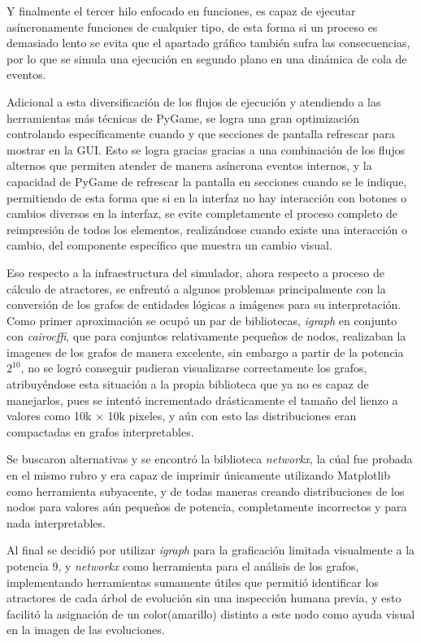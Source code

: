 \documentclass[]{article}
\begin{document}
		\hfill\break
		\justifying
		Y finalmente el tercer hilo enfocado en funciones, es capaz de ejecutar asíncronamente funciones de cualquier tipo, de esta forma si un proceso es demasiado lento se evita que el apartado gráfico también sufra las consecuencias, por lo que se simula una ejecución en segundo plano en una dinámica de cola de eventos.
		
		\hfill\break
		\justifying
		Adicional a esta diversificación de los flujos de ejecución y atendiendo a las herramientas más técnicas de PyGame, se logra una gran optimización controlando específicamente cuando y que secciones de pantalla refrescar para mostrar en la GUI. Esto se logra gracias gracias a una combinación de los flujos alternos que permiten atender de manera asíncrona eventos internos, y la capacidad de PyGame de refrescar la pantalla en secciones cuando se le indique, permitiendo de esta forma que si en la interfaz no hay interacción con botones o cambios diversos en la interfaz, se evite completamente el proceso completo de reimpresión de todos los elementos, realizándose cuando existe una interacción o cambio, del componente específico que muestra un cambio visual.
		
		\hfill\break
		\justifying
		Eso respecto a la infraestructura del simulador, ahora respecto a proceso de cálculo de atractores, se enfrentó a algunos problemas principalmente con la conversión de los grafos de entidades lógicas a imágenes para su interpretación. Como primer aproximación se ocupó un par de bibliotecas, \textit{igraph} en conjunto con \textit{cairocffi}, que para conjuntos relativamente pequeños de nodos, realizaban la imagenes de los grafos de manera excelente, sin embargo a partir de la potencia $2^10$, no se logró conseguir pudieran visualizarse correctamente los grafos, atribuyéndose esta situación a la propia biblioteca que ya no es capaz de manejarlos, pues se intentó incrementado drásticamente el tamaño del lienzo a valores como 10k $\times$ 10k pixeles, y aún con esto las distribuciones eran compactadas en grafos interpretables.
		
		\hfill\break
		\justifying
		Se buscaron alternativas y se encontró la biblioteca \textit{networkx}, la cúal fue probada en el mismo rubro y era capaz de imprimir únicamente utilizando Matplotlib como herramienta subyacente, y de todas maneras creando distribuciones de los nodos para valores aún pequeños de potencia, completamente incorrectos y para nada interpretables.
		
		\hfill\break
		\justifying
		Al final se decidió por utilizar \textit{igraph} para la graficación limitada visualmente a la potencia 9, y \textit{networkx} como herramienta para el análisis de los grafos, implementando herramientas sumamente útiles que permitió identificar los atractores de cada árbol de evolución sin una inspección humana previa, y esto facilitó la asignación de un color(amarillo) distinto a este nodo como ayuda visual en la imagen de las evoluciones.
		
\end{document}
